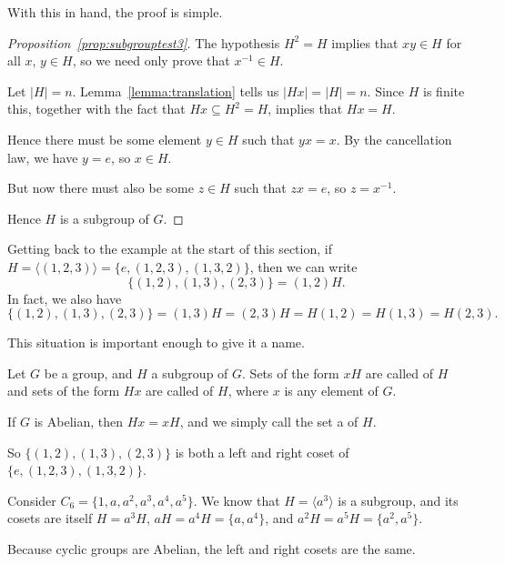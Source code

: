 With this in hand, the proof is simple.

\begin{proof}[Proposition~\ref{prop:subgrouptest3}]
  The hypothesis $H^{2} = H$ implies that $xy \in H$ for all $x$, $y 
  \in H$, so we need only prove that $x^{-1} \in H$.
  
  Let $|H| = n$.  Lemma~\ref{lemma:translation} tells us
  $|Hx| = |H| = n$.  Since $H$ is finite this, together with the fact that $Hx \subseteq
  H^{2} = H$, implies that $Hx = H$.
  
  Hence there must be some element $y \in H$ such that $yx =
  x$.  By the cancellation law, we have $y = e$, so $x \in H$.
  
  But now there must also be some $z \in H$ such that $zx = 
  e$, so $z = x^{-1}$.
  
  Hence $H$ is a subgroup of $G$.
\end{proof}

Getting back to the example at the start of this section, if $H = 
\langle (1,2,3) \rangle = \{e, (1,2,3), (1,3,2)\}$, then we can write
\[
  \{ (1,2), (1,3), (2,3) \} = (1,2)H.
\]
In fact, we also have
\[
  \{ (1,2), (1,3), (2,3) \} = (1,3)H = (2,3)H = H(1,2) = H(1,3) = H(2,3).
\]

This situation is important enough to give it a name.

\begin{definition}\label{defn:coset}
  Let $G$ be a group, and $H$ a subgroup of $G$.  Sets of the form
  $xH$ are called  of $H$ and sets of
  the form $Hx$ are called  of $H$,
  where $x$ is any element of $G$.
  
  If $G$ is Abelian, then $Hx = xH$, and we simply call the set a 
   of $H$.
\end{definition}

So $\{ (1,2), (1,3), (2,3) \}$ is both a left and right coset of
$\{e, (1,2,3), (1,3,2)\}$.

\begin{example}
  Consider $C_{6} = \{ 1, a, a^{2}, a^{3}, a^{4}, a^{5}\}$.  We know
  that $H = \langle a^{3} \rangle$ is a subgroup, and its cosets are
  itself $H = a^{3}H$, $aH = a^{4}H = \{a, a^{4}\}$, and $a^{2}H =
  a^{5}H = \{a^{2}, a^{5}\}$.
  
  Because cyclic groups are Abelian, the left and right cosets are 
  the same.
\end{example}

